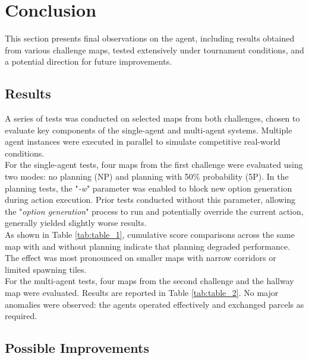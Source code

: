 
\section{Conclusion}

    This section presents final observations on the agent, including results obtained from various challenge maps, tested extensively under tournament conditions, and a potential direction for future improvements.

    \subsection{Results}
        A series of tests was conducted on selected maps from both challenges, chosen to evaluate key components of the single-agent and multi-agent systems. Multiple agent instances were executed in parallel to simulate competitive real-world conditions.
        \medskip\\
        For the single-agent tests, four maps from the first challenge were evaluated using two modes: no planning (NP) and planning with 50\% probability (5P). In the planning tests, the "\textit{-w}" parameter was enabled to block new option generation during action execution. Prior tests conducted without this parameter, allowing the "\textit{option generation}" process to run and potentially override the current action, generally yielded slightly worse results.
        \medskip\\
        As shown in Table \ref{tab:table_1}, cumulative score comparisons across the same map with and without planning indicate that planning degraded performance. The effect was most pronounced on smaller maps with narrow corridors or limited spawning tiles.
        \medskip\\
        For the multi-agent tests, four maps from the second challenge and the hallway map were evaluated. Results are reported in Table \ref{tab:table_2}. No major anomalies were observed: the agents operated effectively and exchanged parcels as required.
    
    \subsection{Possible Improvements}

